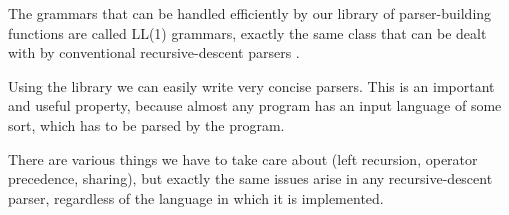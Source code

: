 The grammars that can be handled efficiently by our library of
parser-building functions are called LL(1) grammars, exactly the same
class that can be dealt with by conventional recursive-descent
parsers
\cite{Dragon}.

Using the library we can easily write very concise parsers.  This is
an important and useful property, because almost any program has an
input language of some sort, which has to be parsed by the program.

There are various things we have to take care about (left recursion,
operator precedence, sharing), but exactly the same issues arise in
any recursive-descent parser, regardless of the language in which it
is implemented.

\theendnotes

